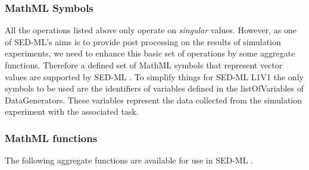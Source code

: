 \subsubsection{MathML Symbols}
All the operations listed above only operate on \emph{singular} values. However, as one of SED-ML's aims is to provide post processing on the results of simulation experiments, we need to enhance this basic set of operations by some aggregate functions. 
Therefore a defined set of MathML symbols that represent vector values are supported by SED-ML \LoneVone. 
To simplify things for SED-ML L1V1 the only symbols to be used are the identifiers of variables defined in the listOfVariables of DataGenerators. These variables represent the data collected from the simulation experiment with the associated task. 

\subsubsection{MathML functions}
The following aggregate functions are available for use in SED-ML \LoneVone.

